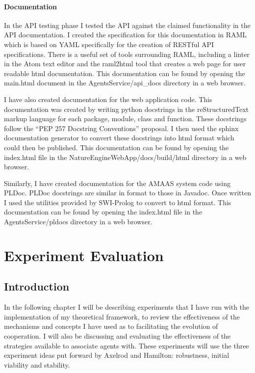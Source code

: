 \documentclass[]{final_report}
\begin{document}
\subsubsection{Documentation}
In the API testing phase I tested the API against the claimed functionality in the API documentation. I created the specification for this documentation in RAML which is based on YAML specifically for the creation of RESTful API specifications. There is a useful set of tools surrounding RAML, including a linter in the Atom text editor and the raml2html tool that creates a web page for user readable html documentation. This documentation can be found by opening the main.html document in the AgentsService/api\_docs directory in a web browser.\par 
I have also created documentation for the web application code. This documentation was created by writing python docstrings in the reStructuredText markup language for each package, module, class and function. These docstrings follow the ``PEP 257 Docstring Conventions'' proposal. I then used the sphinx documentation generator to convert these docstrings into html format which could then be published. This documentation can be found by opening the index.html file in the NatureEngineWebApp/docs/build/html directory in a web browser.\par 
Similarly, I have created documentation for the AMAAS system code using PLDoc. PLDoc docstrings are similar in format to those in Javadoc. Once written I used the utilities provided by SWI-Prolog to convert to html format. This documentation can be found by opening the index.html file in the AgentsService/pldocs directory in a web browser.


\chapter{Experiment Evaluation}
\label{chap:exp}
\section{Introduction}
In the following chapter I will be describing experiments that I have run with the implementation of my theoretical framework, to review the effectiveness of the mechanisms and concepts I have used as to facilitating the evolution of cooperation. I will also be discussing and evaluating the effectiveness of the strategies available to associate agents with. These experiments will use the three experiment ideas put forward by Axelrod and Hamilton: robustness, initial viability and stability.
\end{document}
